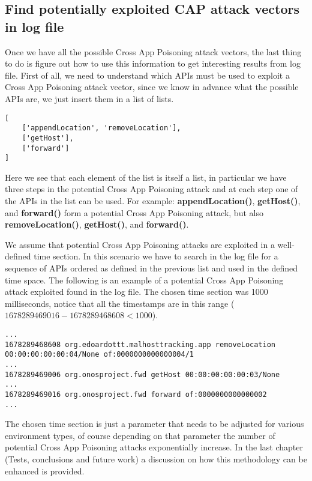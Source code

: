 \documentclass[a4paper,10pt]{memoir}
\begin{document}
\subsection{Find potentially exploited CAP attack vectors in log file}
Once we have all the possible Cross App Poisoning attack vectors, the last thing to do is figure out how to use this information to get interesting results from log file. First of all, we need to understand which APIs must be used to exploit a Cross App Poisoning attack vector, since we know in advance what the possible APIs are, we just insert them in a list of lists.
\begin{lstlisting}[]
[
    ['appendLocation', 'removeLocation'], 
    ['getHost'], 
    ['forward']
]
\end{lstlisting}
Here we see that each element of the list is itself a list, in particular we have three steps in the potential Cross App Poisoning attack and at each step one of the APIs in the list can be used. For example: \textbf{appendLocation()}, \textbf{getHost()}, and \textbf{forward()} form a potential Cross App Poisoning attack, but also \textbf{removeLocation()}, \textbf{getHost()}, and \textbf{forward()}.
\medskip

We assume that potential Cross App Poisoning attacks are exploited in a well-defined time section. In this scenario we have to search in the log file for a sequence of APIs ordered as defined in the previous list and used in the defined time space. The following is an example of a potential Cross App Poisoning attack exploited found in the log file. The chosen time section was 1000 milliseconds, notice that all the timestamps are in this range ($1678289469016-1678289468608 < 1000$).
\begin{lstlisting}[]
...
1678289468608 org.edoardottt.malhosttracking.app removeLocation 00:00:00:00:00:04/None of:0000000000000004/1
...
1678289469006 org.onosproject.fwd getHost 00:00:00:00:00:03/None
...
1678289469016 org.onosproject.fwd forward of:0000000000000002
...
\end{lstlisting}

The chosen time section is just a parameter that needs to be adjusted for various environment types, of course depending on that parameter the number of potential Cross App Poisoning attacks exponentially increase. In the last chapter (Tests, conclusions and future work) a discussion on how this methodology can be enhanced is provided.

\clearpage


\end{document}
